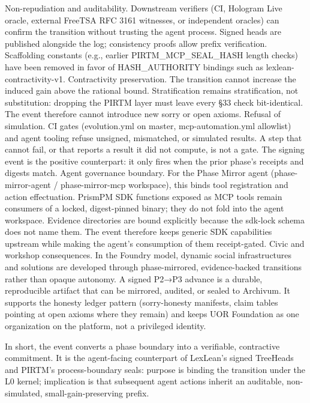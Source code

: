 \documentclass[
]{article}
\begin{document}
Non-repudiation and auditability. Downstream verifiers (CI, Hologram
Live oracle, external FreeTSA RFC 3161 witnesses, or independent
oracles) can confirm the transition without trusting the agent process.
Signed heads are published alongside the log; consistency proofs allow
prefix verification. Scaffolding constants (e.g., earlier
PIRTM\_MCP\_SEAL\_HASH length checks) have been removed in favor of
HASH\_AUTHORITY bindings such as lexlean-contractivity-v1. Contractivity
preservation. The transition cannot increase the induced gain above the
rational bound. Stratification remains stratification, not substitution:
dropping the PIRTM layer must leave every §33 check bit-identical. The
event therefore cannot introduce new sorry or open axioms. Refusal of
simulation. CI gates (evolution.yml on master, mcp-automation.yml
allowlist) and agent tooling refuse unsigned, mismatched, or simulated
results. A step that cannot fail, or that reports a result it did not
compute, is not a gate. The signing event is the positive counterpart:
it only fires when the prior phase's receipts and digests match. Agent
governance boundary. For the Phase Mirror agent (phase-mirror-agent /
phase-mirror-mcp workspace), this binds tool registration and action
effectuation. PrismPM SDK functions exposed as MCP tools remain
consumers of a locked, digest-pinned binary; they do not fold into the
agent workspace. Evidence directories are bound explicitly because the
sdk-lock schema does not name them. The event therefore keeps generic
SDK capabilities upstream while making the agent's consumption of them
receipt-gated. Civic and workshop consequences. In the Foundry model,
dynamic social infrastructures and solutions are developed through
phase-mirrored, evidence-backed transitions rather than opaque autonomy.
A signed P2→P3 advance is a durable, reproducible artifact that can be
mirrored, audited, or sealed to Archivum. It supports the honesty ledger
pattern (sorry-honesty manifests, claim tables pointing at open axioms
where they remain) and keeps UOR Foundation as one organization on the
platform, not a privileged identity.

In short, the event converts a phase boundary into a verifiable,
contractive commitment. It is the agent-facing counterpart of LexLean's
signed TreeHeads and PIRTM's process-boundary seals: purpose is binding
the transition under the L0 kernel; implication is that subsequent agent
actions inherit an auditable, non-simulated, small-gain-preserving
prefix.
\end{document}
